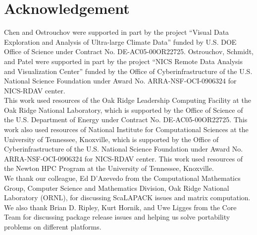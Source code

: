 
\section*{Acknowledgement}

Chen and Ostrouchov were supported in part by the project
``Visual Data Exploration and Analysis of Ultra-large Climate Data''
funded by U.S. DOE Office of Science
under Contract No. DE-AC05-00OR22725.
Ostrouchov, Schmidt, and Patel were supported in part by the project
``NICS Remote Data Analysis and Visualization Center''
funded by the Office of Cyberinfrastructure of the
U.S. National Science Foundation
under Award No. ARRA-NSF-OCI-0906324 for NICS-RDAV center.
\\

This work used resources of the Oak Ridge Leadership Computing Facility at the
Oak Ridge National Laboratory, which is supported by the Office of Science
of the U.S. Department of Energy under Contract No. DE-AC05-00OR22725.
This work also used resources of National Institute for Computational
Sciences at the University of Tennessee, Knoxville, which is supported
by the Office of Cyberinfrastructure of the U.S. National Science Foundation
under Award No. ARRA-NSF-OCI-0906324 for NICS-RDAV center.
This work used resources of the Newton HPC Program at the University of
Tennessee, Knoxville.
\\

We thank our colleague, Ed D'Azevedo
from the Computational Mathematics Group,
Computer Science and Mathematics Division,
Oak Ridge National Laboratory (ORNL),
for discussing ScaLAPACK issues and matrix computation.
\\

We also thank Brian D. Ripley, Kurt Hornik, and Uwe Ligges from the
 Core Team for discussing package release issues and
helping us solve portability problems on different platforms.
\\
